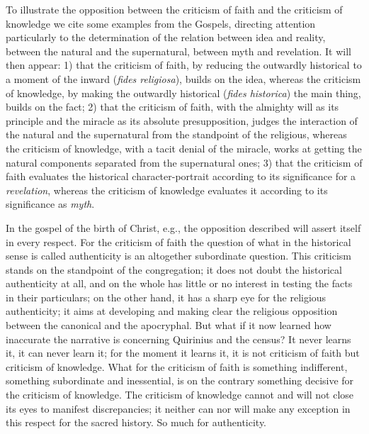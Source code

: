\documentclass[12pt]{book}
\newcommand{\opage}[1]{\marginnote{\footnotesize\textit{[#1]}}}
\begin{document}
To illustrate the opposition between the criticism of faith and the criticism of knowledge we cite some examples from the Gospels, directing attention particularly to the determination of the relation between idea and reality, between the natural
\opage{59}\setcounter{footnote}{0}%
and the supernatural, between myth and revelation. It will then appear: 1) that the criticism of faith, by reducing the outwardly historical to a moment of the inward (\textit{fides religiosa}), builds on the idea, whereas the criticism of knowledge, by making the outwardly historical (\textit{fides historica}) the main thing, builds on the fact; 2) that the criticism of faith, with the almighty will as its principle and the miracle as its absolute presupposition, judges the interaction of the natural and the supernatural from the standpoint of the religious, whereas the criticism of knowledge, with a tacit denial of the miracle, works at getting the natural components separated from the supernatural ones; 3) that the criticism of faith evaluates the historical character-portrait according to its significance for a \emph{revelation}, whereas the criticism of knowledge evaluates it according to its significance as \emph{myth}.

In the gospel of the birth of Christ, e.g., the opposition described will assert itself in every respect. For the criticism of faith the question of what in the historical sense is called authenticity is an altogether subordinate question. This criticism stands on the standpoint of the congregation; it does not doubt the historical authenticity at all, and on the whole has little or no interest in testing the facts in their particulars; on the other hand, it has a sharp eye for the religious authenticity; it aims at developing and making clear the religious opposition between the canonical and the apocryphal. But what if it now learned how inaccurate the narrative is concerning Quirinius and the census? It never learns it, it can never learn it; for the moment it learns it, it is not criticism of faith but criticism of knowledge. What for the criticism of faith is something indifferent, something subordinate and inessential, is on the contrary something decisive for the criticism of knowledge. The criticism of knowledge cannot and will not close its eyes to manifest discrepancies; it neither can nor will make any exception in this respect for the sacred history. So much for authenticity.
\end{document}
